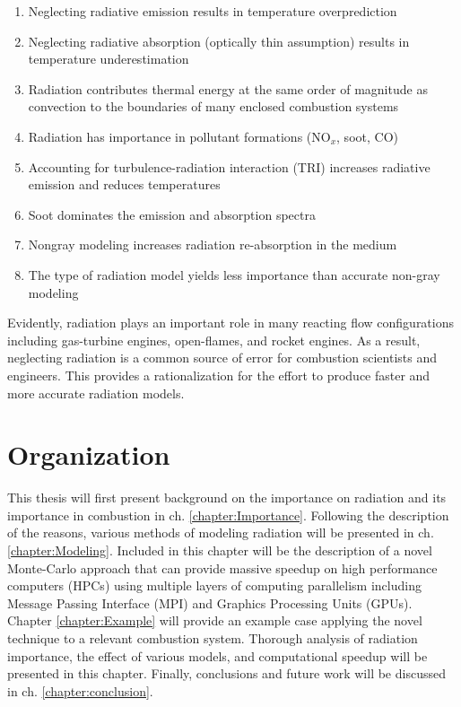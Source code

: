 \begin{enumerate}
    \item Neglecting radiative emission results in temperature overprediction \cite{Gamil2020AssessmentChamber}
    \item Neglecting radiative absorption (optically thin assumption) results in temperature underestimation
    \item Radiation contributes thermal energy at the same order of magnitude as convection to the boundaries of many enclosed combustion systems \cite{Gamil2020AssessmentChamber,Johnson2021AnalysisMethod}
    \item Radiation has importance in pollutant formations (NO${}_x$, soot, CO) \cite{Ihme2008ModelingFormulation,Habibi2007TurbulenceFlames}
    \item Accounting for turbulence-radiation interaction (TRI) increases radiative emission and reduces temperatures
    \item Soot dominates the emission and absorption spectra
    \item Nongray modeling increases radiation re-absorption in the medium\cite{Wu2021LimitationsFires}
    \item The type of radiation model yields less importance than accurate non-gray modeling
\end{enumerate}

Evidently, radiation plays an important role in many reacting flow configurations including gas-turbine engines, open-flames, and rocket engines.
As a result, neglecting radiation is a common source of error for combustion scientists and engineers. 
This provides a rationalization for the effort to produce faster and more accurate radiation models.


\section{Organization}
This thesis will first present background on the importance on radiation and its importance in combustion in ch. \ref{chapter:Importance}. 
Following the description of the reasons, various methods of modeling radiation will be presented in ch. \ref{chapter:Modeling}. Included in this chapter will be the description of a novel Monte-Carlo approach that can provide massive speedup on high performance computers (HPCs) using multiple layers of computing parallelism including Message Passing Interface (MPI) and Graphics Processing Units (GPUs).
Chapter \ref{chapter:Example} will provide an example case applying the novel technique to a relevant combustion system. Thorough analysis of radiation importance, the effect of various models, and computational speedup will be presented in this chapter.
Finally, conclusions and future work will be discussed in ch. \ref{chapter:conclusion}.